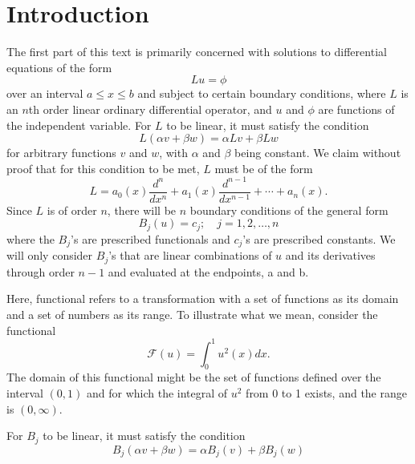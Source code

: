 \section{Introduction}
The first part of this text is primarily concerned with solutions to differential equations of the form
\begin{equation}
    Lu=\phi
\end{equation}
over an interval \(a \leq x \leq b\) and subject to certain boundary conditions, where \(L\) is an \(n\)th order linear ordinary differential operator, and \(u\) and \(\phi\) are functions of the independent variable. For \(L\) to be linear, it must satisfy the condition
\begin{equation}
	L(\alpha v + \beta w) = \alpha Lv + \beta Lw
\end{equation}
for arbitrary functions \(v\) and \(w\), with \(\alpha\) and \(\beta\) being constant. We claim without proof that for this condition to be met, \(L\) must be of the form
\begin{equation} 
	L = a_0(x) \frac{d^n}{dx^n} + a_1(x) \frac{d^{n-1}}{dx^{n-1}} + \cdots + a_n(x).
\end{equation}
Since \(L\) is of order \(n\), there will be \(n\) boundary conditions of the general form 
\begin{equation}
	B_j (u) = c_j;\quad j=1,2,\dots,n
\end{equation}
where the \(B_j\)'s are prescribed functionals and \(c_j\)'s are prescribed constants. We will only consider \(B_j\)'s that are linear combinations of \(u\) and its derivatives through order \(n-1\) and evaluated at the endpoints, a and b. 

Here, functional refers to a transformation with a set of functions as its domain and a set of numbers as its range. To illustrate what we mean, consider the functional 
\begin{equation}
	\mathcal{F}(u) = \int_{0}^{1} u^2(x)dx.
\end{equation}
The domain of this functional might be the set of functions defined over the interval \((0,1)\) and for which the integral of \(u^2\) from 0 to 1 exists, and the range is \((0, \infty)\).

For \(B_j\) to be linear, it must satisfy the condition
\begin{equation}
	B_j(\alpha v + \beta w) = \alpha B_j (v) + \beta B_j(w)
\end{equation}